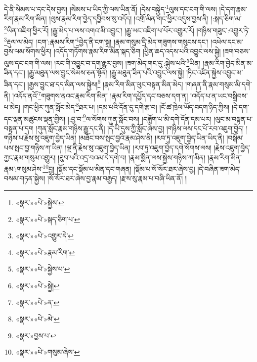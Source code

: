དེ་ནི་སེམས་པ་དང་དེས་བྱས། །སེམས་པ་ཡིད་ཀྱི་ལས་ཡིན་ནོ། །དེས་བསྐྱེད་\footnote{«སྣར་»«པེ་»སྐྱེས་}ལུས་དང་ངག་གི་ལས། །དེ་དག་རྣམ་རིག་རྣམ་རིག་མིན། །ལུས་རྣམ་རིག་བྱེད་དབྱིབས་སུ་འདོད། །འགྲོ་མིན་གང་ཕྱིར་འདུས་བྱས་ནི། །:སྐད་ཅིག་མ་\footnote{«སྣར་»«པེ་»སྐད་ཅིག་པ་}ཡིན་འཇིག་ཕྱིར་རོ། །རྒྱུ་མེད་པ་ལས་འགའ་མི་འབྱུང་། །རྒྱུ་ཡང་འཇིག་པ་པོར་འགྱུར་རོ། །གཉིས་གཟུང་:འགྱུར་ཏེ་\footnote{«སྣར་»«པེ་»འགྱུར་དེ་}རྡུལ་ལ་མེད། །ངག་:རྣམས་རིག་\footnote{«སྣར་»«པེ་»རྣམ་རིག་}བྱེད་ནི་ངག་སྒྲ། །རྣམ་གསུམ་དྲི་མེད་གཟུགས་གསུངས་དང་། །འཕེལ་དང་མ་བྱས་ལམ་སོགས་ཕྱིར། །འདོད་གཏོགས་རྣམ་རིག་མིན་སྐད་ཅིག །ཕྱིན་ཆད་འདས་པའི་འབྱུང་ལས་སྐྱེ། །ཟག་བཅས་ལུས་དང་ངག་གི་ལས། །རང་གི་འབྱུང་བ་དག་རྒྱུར་བྱས། །ཟག་མེད་གང་དུ་:སྐྱེས་པའི་\footnote{«སྣར་»«པེ་»སྐྱེས་པ་}ཡིན། །རྣམ་རིག་བྱེད་མིན་མ་ཟིན་དང་། །རྒྱུ་མཐུན་ལས་བྱུང་སེམས་ཅན་སྟོན། །རྒྱུ་མཐུན་ཟིན་པའི་འབྱུང་ལས་སྐྱེ། །ཏིང་འཛིན་སྐྱེས་འབྱུང་མ་ཟིན་དང་། །རྒྱས་བྱུང་ཐ་དད་མིན་ལས་སྐྱེས།\footnote{«སྣར་»«པེ་»སྐྱེ།} །རྣམ་རིག་མིན་ལུང་བསྟན་མིན་མེད། །གཞན་ནི་རྣམ་གསུམ་མི་དགེ་ནི། །འདོད་ནའོ་\footnote{«སྣར་»«པེ་»ན་}གཟུགས་ནའང་རྣམ་རིག་མིན། །རྣམ་རིག་དཔྱོད་དང་བཅས་དག་ན། །འདོད་པ་ན་ཡང་བསྒྲིབས་པ་མེད། །གང་ཕྱིར་ཀུན་སློང་མེད་\footnote{«སྣར་»«པེ་»མེ་}ཐར་པ། །དམ་པའི་དོན་དུ་དགེ་རྩ་བ། །ངོ་ཚ་ཁྲེལ་ཡོད་བདག་ཉིད་ཀྱིས། །དེ་དག་དང་ལྡན་མཚུངས་ལྡན་གྱིས། །:བྱ་བ་\footnote{«སྣར་»བྱས་པ་}ལ་སོགས་ཀུན་སློང་བས། །བཟློག་པ་མི་དགེ་དོན་དམ་པར། །ལུང་མ་བསྟན་པ་བསྟན་པ་དག །ཀུན་སློང་རྣམ་གཉིས་རྒྱུ་དང་ནི། །དེ་ཡི་དུས་ཀྱི་སློང་ཞེས་བྱ། །གཉིས་ལས་དང་པོ་རབ་འཇུག་བྱེད། །གཉིས་པ་རྗེས་སུ་འཇུག་བྱེད་ཡིན། །མཐོང་བས་སྤང་བྱའི་རྣམ་ཤེས་ནི། །རབ་ཏུ་འཇུག་བྱེད་ཡིན་ཡིད་ནི། །བསྒོམ་པས་སྤང་བྱ་གཉིས་ཀ་ཡིན། །ལྔ་ནི་རྗེས་སུ་འཇུག་བྱེད་ཡིན། །རབ་ཏུ་འཇུག་བྱེད་དགེ་སོགས་ལས། །རྗེས་འཇུག་བྱེད་ཀྱང་རྣམ་གསུམ་འགྱུར། །ཐུབ་པའི་འདྲ་བའམ་དེ་དགེ་བ། །རྣམ་སྨིན་ལས་སྐྱེས་གཉིས་ཀ་མིན། །རྣམ་རིག་མིན་རྣམ་:གསུམ་ཤེས་\footnote{«སྣར་»«པེ་»གསུམ་ཞེས་}བྱ། །སྡོམ་དང་སྡོམ་པ་མིན་དང་གཞན། །སྡོམ་པ་སོ་སོར་ཐར་ཞེས་བྱ། །དེ་བཞིན་ཟག་མེད་བསམ་གཏན་སྐྱེས། །སོ་སོར་ཐར་ཞེས་བྱ་རྣམ་བརྒྱད། །རྫས་སུ་རྣམ་པ་བཞི་ཡིན་ནོ། །
